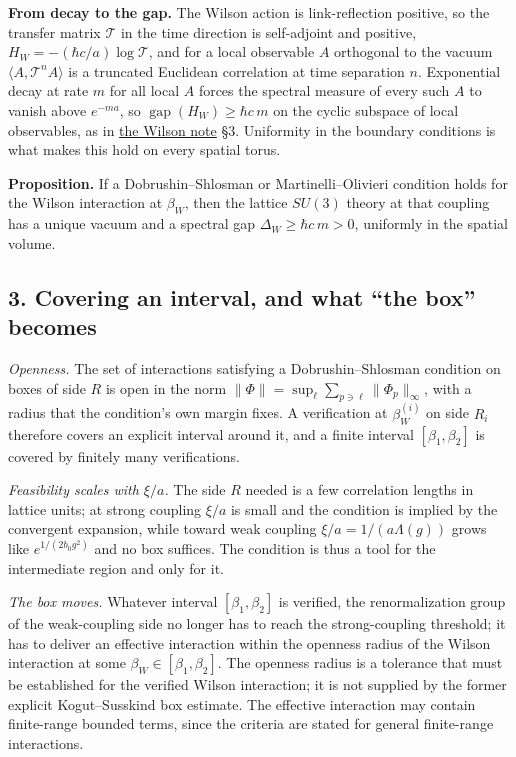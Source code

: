 \documentclass[11pt,a4paper]{article}
\begin{document}
\textbf{From decay to the gap.} The Wilson action is link-reflection
positive, so the transfer matrix \(\mathcal T\) in the time direction is
self-adjoint and positive, \(H_W=-(\hbar c/a)\log\mathcal T\), and for a
local observable \(A\) orthogonal to the vacuum
\(\langle A,\mathcal T^nA\rangle\) is a truncated Euclidean correlation
at time separation \(n\). Exponential decay at rate \(m\) for all local
\(A\) forces the spectral measure of every such \(A\) to vanish above
\(e^{-ma}\), so \(\operatorname{gap}(H_W)\ge\hbar c\,m\) on the cyclic
subspace of local observables, as in
\href{wilson-strong-coupling-explicit.md}{the Wilson note} §3.
Uniformity in the boundary conditions is what makes this hold on every
spatial torus.

\textbf{Proposition.} If a Dobrushin--Shlosman or Martinelli--Olivieri
condition holds for the Wilson interaction at \(\beta_W\), then the
lattice \(SU(3)\) theory at that coupling has a unique vacuum and a
spectral gap \(\Delta_W\ge\hbar c\,m>0\), uniformly in the spatial
volume.

\subsection{3. Covering an interval, and what ``the box''
becomes}\label{covering-an-interval-and-what-the-box-becomes}

\emph{Openness.} The set of interactions satisfying a
Dobrushin--Shlosman condition on boxes of side \(R\) is open in the norm
\(\|\Phi\|=\sup_\ell\sum_{p\ni\ell}\|\Phi_p\|_\infty\), with a radius
that the condition's own margin fixes. A verification at
\(\beta_W^{(i)}\) on side \(R_i\) therefore covers an explicit interval
around it, and a finite interval \([\beta_1,\beta_2]\) is covered by
finitely many verifications.

\emph{Feasibility scales with \(\xi/a\).} The side \(R\) needed is a few
correlation lengths in lattice units; at strong coupling \(\xi/a\) is
small and the condition is implied by the convergent expansion, while
toward weak coupling \(\xi/a=1/(a\Lambda(g))\) grows like
\(e^{1/(2b_0g^2)}\) and no box suffices. The condition is thus a tool
for the intermediate region and only for it.

\emph{The box moves.} Whatever interval \([\beta_1,\beta_2]\) is
verified, the renormalization group of the weak-coupling side no longer
has to reach the strong-coupling threshold; it has to deliver an
effective interaction within the openness radius of the Wilson
interaction at some \(\beta_W\in[\beta_1,\beta_2]\). The openness radius
is a tolerance that must be established for the verified Wilson
interaction; it is not supplied by the former explicit Kogut--Susskind
box estimate. The effective interaction may contain finite-range bounded
terms, since the criteria are stated for general finite-range
interactions.
\end{document}
